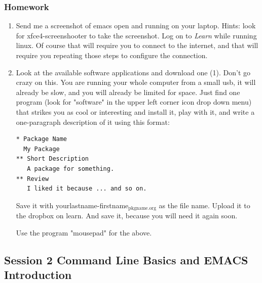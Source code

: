 \documentclass{article}
\begin{document}
\subsubsection{Homework}
\label{sec:org6832871}
\begin{enumerate}
\item Send me a screenshot of emacs open and running on your laptop.
Hints: look for xfce4-screenshooter to take the screenshot. Log on to \emph{Learn} while running linux. Of course that will require you to connect to the internet, and that will require you repeating those steps to configure the connection.
\item Look at the available software applications and download one (1). Don't go crazy on this. You are running your whole computer from a small usb, it will already be slow, and you will already be limited for space. Just find one program (look for "software" in the upper left corner icon drop down menu) that strikes you as cool or interesting and install it, play with it, and write a one-paragraph description of it using this format:

\begin{verbatim}
* Package Name
  My Package
** Short Description
   A package for something.
** Review
   I liked it because ... and so on.
\end{verbatim}

Save it with yourlastname-firstname\(_{\text{pkgname.org}}\) as the file name. Upload it to the dropbox on learn. And save it, because you will need it again soon. 

Use the program "mousepad" for the above.
\end{enumerate}
\subsection{Session 2 Command Line Basics and EMACS Introduction}
\label{sec:org373872b}
\end{document}
